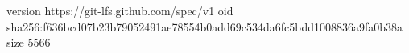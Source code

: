 version https://git-lfs.github.com/spec/v1
oid sha256:f636bcd07b23b79052491ae78554b0add69c534da6fc5bdd1008836a9fa0b38a
size 5566
